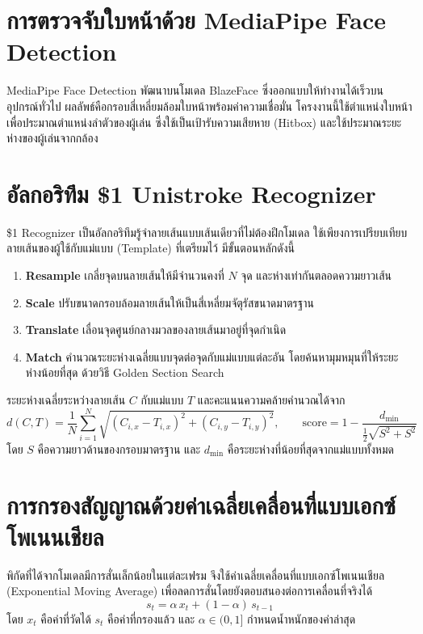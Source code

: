 \documentclass[12pt,a4paper]{report}
\begin{document}
\section{การตรวจจับใบหน้าด้วย MediaPipe Face Detection}
MediaPipe Face Detection พัฒนาบนโมเดล BlazeFace \cite{bazarevsky2019blazeface} ซึ่งออกแบบให้ทำงานได้เร็วบนอุปกรณ์ทั่วไป
ผลลัพธ์คือกรอบสี่เหลี่ยมล้อมใบหน้าพร้อมค่าความเชื่อมั่น โครงงานนี้ใช้ตำแหน่งใบหน้าเพื่อประมาณตำแหน่งลำตัวของผู้เล่น
ซึ่งใช้เป็นเป้ารับความเสียหาย (Hitbox) และใช้ประมาณระยะห่างของผู้เล่นจากกล้อง

\section{อัลกอริทึม \$1 Unistroke Recognizer}
\$1 Recognizer \cite{wobbrock2007dollar} เป็นอัลกอริทึมรู้จำลายเส้นแบบเส้นเดียวที่ไม่ต้องฝึกโมเดล
ใช้เพียงการเปรียบเทียบลายเส้นของผู้ใช้กับแม่แบบ (Template) ที่เตรียมไว้ มีขั้นตอนหลักดังนี้
\begin{enumerate}[leftmargin=2cm]
  \item \textbf{Resample} เกลี่ยจุดบนลายเส้นให้มีจำนวนคงที่ $N$ จุด และห่างเท่ากันตลอดความยาวเส้น
  \item \textbf{Scale} ปรับขนาดกรอบล้อมลายเส้นให้เป็นสี่เหลี่ยมจัตุรัสขนาดมาตรฐาน
  \item \textbf{Translate} เลื่อนจุดศูนย์กลางมวลของลายเส้นมาอยู่ที่จุดกำเนิด
  \item \textbf{Match} คำนวณระยะห่างเฉลี่ยแบบจุดต่อจุดกับแม่แบบแต่ละอัน โดยค้นหามุมหมุนที่ให้ระยะห่างน้อยที่สุด
        ด้วยวิธี Golden Section Search
\end{enumerate}
ระยะห่างเฉลี่ยระหว่างลายเส้น $C$ กับแม่แบบ $T$ และคะแนนความคล้ายคำนวณได้จาก
\begin{equation}
  d(C,T) = \frac{1}{N}\sum_{i=1}^{N}\sqrt{(C_{i,x}-T_{i,x})^2 + (C_{i,y}-T_{i,y})^2},
  \qquad
  \text{score} = 1 - \frac{d_{\min}}{\tfrac{1}{2}\sqrt{S^2+S^2}}
  \label{eq:score}
\end{equation}
โดย $S$ คือความยาวด้านของกรอบมาตรฐาน และ $d_{\min}$ คือระยะห่างที่น้อยที่สุดจากแม่แบบทั้งหมด

\section{การกรองสัญญาณด้วยค่าเฉลี่ยเคลื่อนที่แบบเอกซ์โพเนนเชียล}
พิกัดที่ได้จากโมเดลมีการสั่นเล็กน้อยในแต่ละเฟรม จึงใช้ค่าเฉลี่ยเคลื่อนที่แบบเอกซ์โพเนนเชียล (Exponential Moving Average)
เพื่อลดการสั่นโดยยังตอบสนองต่อการเคลื่อนที่จริงได้
\begin{equation}
  s_t = \alpha\,x_t + (1-\alpha)\,s_{t-1}
  \label{eq:ema}
\end{equation}
โดย $x_t$ คือค่าที่วัดได้ $s_t$ คือค่าที่กรองแล้ว และ $\alpha \in (0,1]$ กำหนดน้ำหนักของค่าล่าสุด
\end{document}
